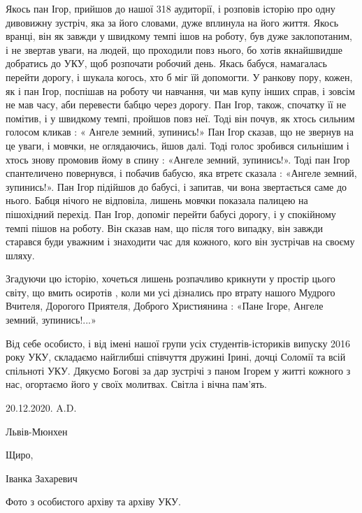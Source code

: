 Якось пан Ігор, прийшов до нашої 318 аудиторії, і розповів історію про одну
дивовижну  зустріч, яка за його словами, дуже вплинула на його життя. Якось
вранці, він як завжди у швидкому темпі ішов на роботу, був дуже заклопотаним, і
не звертав уваги, на людей, що проходили повз нього, бо хотів якнайшвидше
добратись до УКУ, щоб розпочати робочий день. Якась бабуся, намагалась перейти
дорогу, і шукала когось, хто б міг їй допомогти. У ранкову пору, кожен, як і
пан Ігор, поспішав на роботу чи навчання, чи мав купу інших справ, і зовсім не
мав часу, аби перевести бабцю через дорогу. Пан Ігор, також, спочатку її не
помітив, і у швидкому темпі, пройшов повз неї. Тоді він почув, як хтось сильним
голосом кликав : « Ангеле земний, зупинись!» Пан Ігор сказав, що не звернув на
це уваги, і мовчки, не оглядаючись, йшов далі. Тоді голос зробився сильнішим і
хтось знову промовив йому в спину : «Ангеле земний, зупинись!». Тоді пан Ігор
спантеличено повернувся, і побачив бабусю, яка втретє сказала : «Ангеле земний,
зупинись!». Пан Ігор підійшов до бабусі, і запитав, чи вона звертається саме до
нього. Бабця нічого не відповіла, лишень мовчки показала палицею на пішохідний
перехід. Пан Ігор, допоміг перейти бабусі дорогу, і у спокійному темпі пішов на
роботу. Він сказав нам, що після того випадку, він завжди старався буди уважним
і знаходити час для кожного, кого він зустрічав на своєму шляху.

Згадуючи цю історію, хочеться лишень розпачливо крикнути у  простір цього
світу, що вмить осиротів , коли ми усі дізнались про втрату нашого Мудрого
Вчителя, Дорогого Приятеля, Доброго Християнина : «Пане Ігоре, Ангеле земний,
зупинись!...» 

Від себе особисто, і від імені нашої групи усіх студентів-істориків випуску
2016 року УКУ, складаємо найглибші співчуття дружині Ірині, дочці Соломії та
всій спільноті УКУ. Дякуємо Богові за дар зустрічі з паном Ігорем у житті
кожного з нас, огортаємо його у своїх молитвах. Світла і вічна пам'ять.

20.12.2020. A.D.

Львів-Мюнхен

Щиро,

Іванка Захаревич

Фото з особистого архіву та архіву УКУ.
